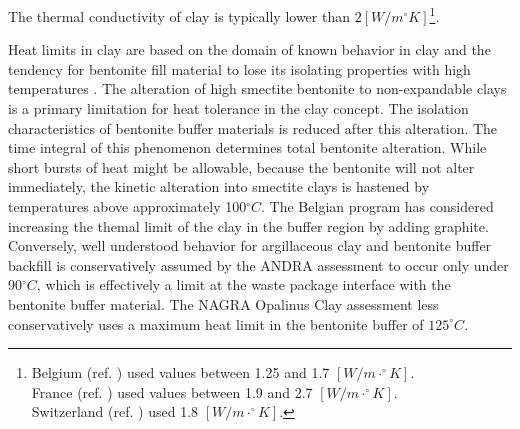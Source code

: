The thermal conductivity of clay is typically lower than 
$2[W/m^{\circ}K]$\footnote{
Belgium (ref. \cite{ondraf-niras_technical_2001}) used values between 1.25 and 1.7 $[W/m\cdot^{\circ}K]$.\\
France (ref. \cite{andra_argile:_2005}) used values between 1.9 and 2.7 $[W/m\cdot^{\circ}K]$.\\
Switzerland (ref. \cite{johnson_calculations_2003}) used 1.8 $[W/m\cdot^{\circ}K]$.
}.

Heat limits in clay are based on the domain of known behavior in clay and the 
tendency for bentonite fill material to lose its isolating properties with high 
temperatures \cite{andra_argile:_2005, pusch_alteration_1987}. 
The alteration of high smectite bentonite to non-expandable clays is a primary 
limitation for heat tolerance in the clay concept. The isolation characteristics 
of bentonite buffer materials is reduced after this alteration. The time 
integral of this phenomenon determines total bentonite alteration. While short 
bursts of heat might be allowable, because the bentonite will not alter 
immediately, the kinetic alteration into smectite clays is hastened by 
temperatures above approximately 100$^{\circ}C$\cite{pusch_alteration_1987}. 
The Belgian program has considered increasing the themal limit of the clay in
the buffer region by adding graphite.
Conversely, well understood behavior for argillaceous clay and bentonite buffer backfill
is conservatively assumed by the \gls{ANDRA} assessment to occur only under  
90$^{\circ}C$, which is effectively a limit at the waste package interface with 
the bentonite buffer material.\cite{andra_argile:_2005} 
The \gls{NAGRA} Opalinus Clay assessment less conservatively 
uses a maximum heat limit in the bentonite buffer of $125^{\circ}C$.
\cite{johnson_project_2002} 


% 

